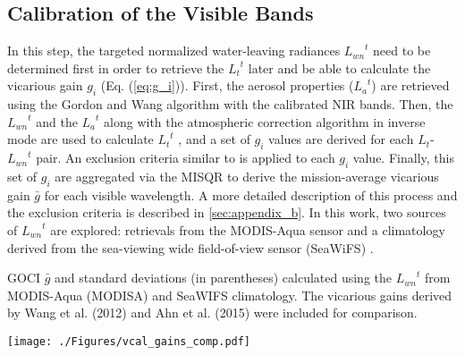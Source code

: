 \documentclass[10pt]{article}
\begin{document}
\subsection{Calibration of the Visible Bands}
In this step, the targeted normalized water-leaving radiances ${L_{wn}}^t$ need to be determined first in order to retrieve the ${L_t}^t$ later and be able to calculate the vicarious gain $g_i$ (Eq. (\ref{eq:g_i})).
First, the aerosol properties (${L_a}^t$) are retrieved using the Gordon and Wang algorithm \cite{Gordon1994} with the calibrated NIR bands.
Then, the ${L_{wn}}^t$ and the ${L_a}^t$ along with the atmospheric correction algorithm in inverse mode are used to calculate ${L_t}^t$ \cite{Franz:07}, and a set of $g_i$ values are derived for each $L_t$-${L_{wn}}^t$ pair.
An exclusion criteria similar to \cite{Bailey2006} is applied to each $g_i$ value.
Finally, this set of $g_i$ are aggregated via the MISQR to derive the mission-average vicarious gain $\bar{g}$ for each visible wavelength.
A more detailed description of this process and the exclusion criteria is described in \autoref{sec:appendix_b}.
In this work, two sources of ${L_{wn}}^t$ are explored: retrievals from the MODIS-Aqua sensor and a climatology derived from the sea-viewing wide field-of-view sensor (SeaWiFS) \cite{McClain2004}.

\begin{landscape}
\begin{table}[htbp!]
\caption{GOCI $\bar{g}$ and standard deviations (in parentheses) calculated using the ${L_{wn}}^t$ from MODIS-Aqua (MODISA) and SeaWIFS climatology. The vicarious gains derived by Wang et al. (2012) \cite{Wang:13} and Ahn et al. (2015) \cite{Ahn2015} were included for comparison. \label{tab:vcal_gains_comp}}

  \centering
    \texttt{[image: ./Figures/vcal\_gains\_comp.pdf]}

\end{table}
\end{landscape}
\end{document}
